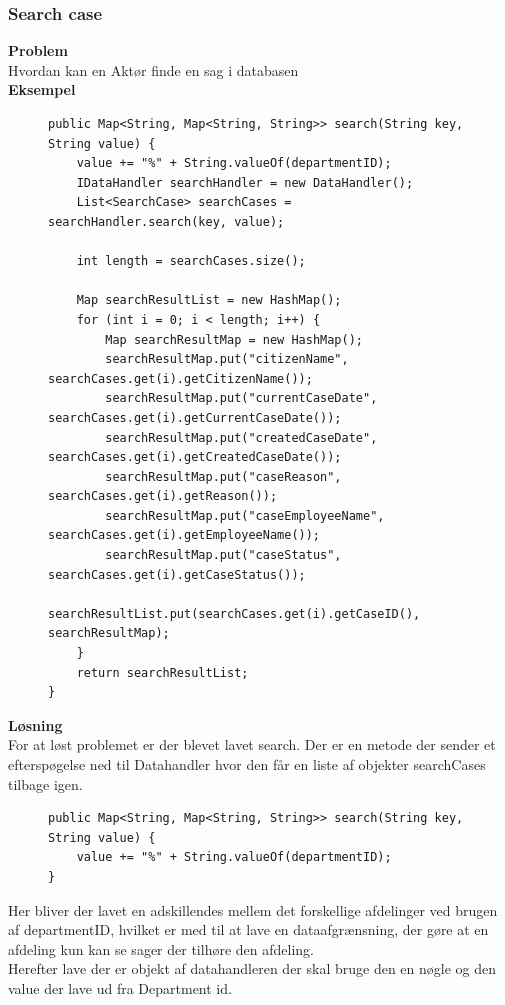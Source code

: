 \subsubsection{Search case}
\textbf{Problem} \\ 
Hvordan kan en Aktør finde en sag i databasen\\
\textbf{Eksempel}
\begin{figure}[hbt!]
\begin{lstlisting}
public Map<String, Map<String, String>> search(String key, String value) {
	value += "%" + String.valueOf(departmentID);
	IDataHandler searchHandler = new DataHandler();
    List<SearchCase> searchCases = searchHandler.search(key, value);

    int length = searchCases.size();

    Map searchResultList = new HashMap();
    for (int i = 0; i < length; i++) {
		Map searchResultMap = new HashMap();
        searchResultMap.put("citizenName", searchCases.get(i).getCitizenName());
        searchResultMap.put("currentCaseDate", searchCases.get(i).getCurrentCaseDate());
        searchResultMap.put("createdCaseDate", searchCases.get(i).getCreatedCaseDate());
        searchResultMap.put("caseReason", searchCases.get(i).getReason());
        searchResultMap.put("caseEmployeeName", searchCases.get(i).getEmployeeName());
        searchResultMap.put("caseStatus", searchCases.get(i).getCaseStatus());
        searchResultList.put(searchCases.get(i).getCaseID(), searchResultMap);
    }
    return searchResultList;
}
\end{lstlisting}
\end{figure}
\textbf{Løsning} \\
For at løst problemet er der blevet lavet search. Der er en metode der sender et efterspøgelse ned til Datahandler hvor den får en liste af objekter searchCases tilbage igen. \\
\begin{figure}[hbt!]
\begin{lstlisting}
public Map<String, Map<String, String>> search(String key, String value) {
	value += "%" + String.valueOf(departmentID);
}
\end{lstlisting}
\end{figure}
Her bliver der lavet en adskillendes mellem det forskellige afdelinger ved brugen af departmentID, hvilket er med til at lave en dataafgrænsning, der gøre at en afdeling kun kan se sager der tilhøre den afdeling.\\
Herefter lave der er objekt af datahandleren der skal bruge den en nøgle og den value der lave ud fra Department id.\\
